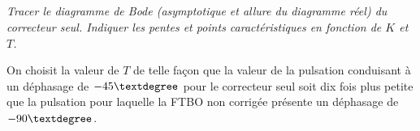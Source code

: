 \documentclass[10pt]{article}
\begin{document}
\subparagraph{}
\textit{Tracer le diagramme de Bode (asymptotique et allure du diagramme réel) du correcteur seul. Indiquer les pentes et points caractéristiques en fonction de $K$ et $T$.}

On choisit la valeur de $T$ de telle façon que la valeur de la pulsation conduisant à un déphasage de $-45\textdegree$ pour le correcteur seul soit dix fois plus petite que la pulsation pour laquelle la FTBO non corrigée présente un déphasage de $-90\textdegree$.
\end{document}
